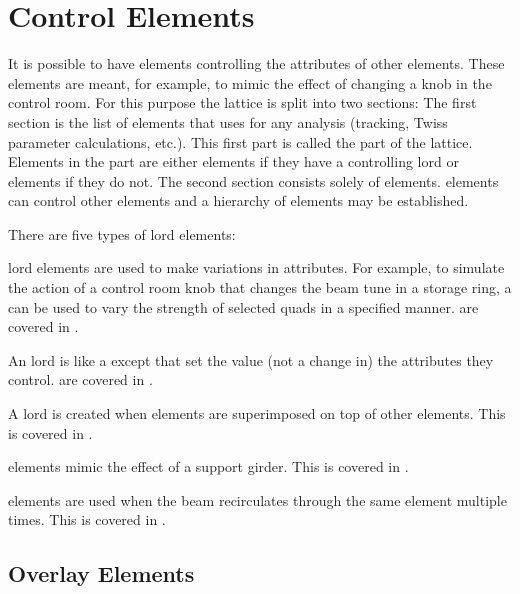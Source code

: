 \chapter {Control Elements}
\label{c:control}

It is possible to have elements controlling the attributes of other
elements. These  elements are meant, for example, to mimic
the effect of changing a knob in the control room. For this purpose
the lattice is split into two sections: The first section is the list
of elements that \bmad uses for any analysis (tracking, Twiss
parameter calculations, etc.). This first part is called the
 part of the lattice.
Elements in the  part are either
 elements if they have a controlling lord or 
elements if they do not.  The second section consists solely of
 elements.  elements can control other 
elements and a hierarchy of  elements may be established.

There are five types of lord elements: 
\begin{Itemize}
\item 
{}
 lord elements are used to make variations in attributes. For example, to
simulate the action of a control room knob that changes the beam tune
in a storage ring, a  can be used to vary the strength of
selected quads in a specified manner.  are covered in .
\item
{}
An  lord is like a  except that 
set the value (not a change in) the attributes they
control.  are covered in .
\item
A  lord is created when elements are superimposed on
top of other elements. This is covered in .
\item
{}
 elements mimic the effect of a support girder. This is
covered in .
\item
{}
 elements are used when the beam recirculates through
the same element multiple times. This is covered in
.
\end{Itemize}

\section{Overlay Elements}
\label{s:overlay}

